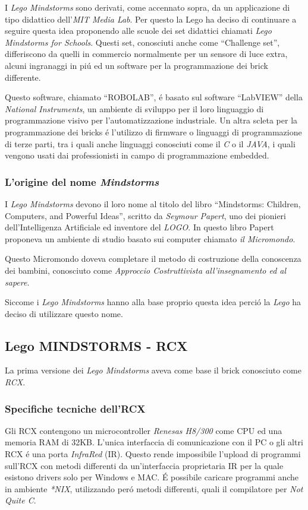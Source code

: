 I \emph{Lego Mindstorms} sono derivati, come accennato sopra, da un applicazione 
di tipo didattico dell'\emph{MIT Media Lab}. Per questo la Lego ha deciso
di continuare a seguire questa idea proponendo alle scuole dei set
didattici chiamati \emph{Lego Mindstorms for Schools}. Questi set,
conosciuti anche come ``Challenge set'', differiscono da quelli in
commercio normalmente per un sensore di luce extra, alcuni ingranaggi in
pi\'u ed un software per la programmazione dei brick differente.

Questo software, chiamato ``ROBOLAB'', \'e basato sul software ``LabVIEW''
della \emph{National Instruments}, un ambiente di sviluppo per il
loro linguaggio di programmazione visivo per l'automatizzazione
industriale. Un altra scleta per la programmazione dei bricks \'e
l'utilizzo di firmware o linguaggi di programmazione di terze parti, tra i
quali anche linguaggi conosciuti come il \emph{C} o il \emph{JAVA}, i quali
vengono usati dai professionisti in campo di programmazione embedded.

\subsubsection{L'origine del nome \emph{Mindstorms}}
I \emph{Lego Mindstorms} devono il loro nome al titolo del libro
``Mindstorms: Children, Computers, and Powerful Ideas''\cite{bib:mindbook},
scritto da \emph{Seymour Papert}, uno dei pionieri dell'Intelligenza
Artificiale ed inventore del \emph{LOGO}. In questo libro Papert proponeva
un ambiente di studio basato sui computer chiamato \emph{il Micromondo}.

Questo Micromondo doveva completare il metodo di costruzione della
conoscenza dei bambini, conosciuto come \emph{Approccio Costruttivista
all'insegnamento ed al sapere}.

Siccome i \emph{Lego Mindstorms} hanno alla base proprio questa idea
perci\'o la \emph{Lego} ha deciso di utilizzare questo
nome\cite{bib:mindbarticle}.

\subsection{Lego MINDSTORMS - RCX}
La prima versione dei \emph{Lego Mindstorms} aveva come base il brick
conosciuto come \emph{RCX}.

\subsubsection{Specifiche tecniche dell'RCX}
Gli RCX contengono un microcontroller 
\emph{Renesas H8/300} come CPU ed una memoria RAM di 32KB. L'unica
interfaccia di comunicazione con il PC o gli altri RCX \'e una porta
\emph{InfraRed} (IR). Questo rende impossibile l'upload di programmi
sull'RCX con metodi differenti da un'interfaccia proprietaria IR per la
quale esistono drivers solo per Windows e MAC. \'E possibile caricare
programmi anche in ambiente \emph{*NIX}, utilizzando per\'o metodi
differenti, quali il compilatore per \emph{Not Quite C}.

